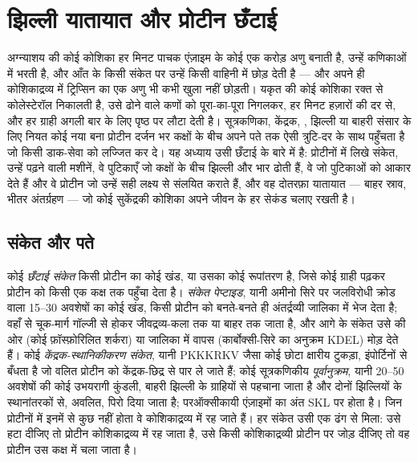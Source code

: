 \chapter{झिल्ली यातायात और प्रोटीन छँटाई}\label{ch:b3:membrane-traffic}

अग्न्याशय की कोई कोशिका हर मिनट पाचक एंज़ाइम के कोई एक करोड़ अणु बनाती
है, उन्हें कणिकाओं में भरती है, और आँत के किसी संकेत पर उन्हें किसी
वाहिनी में छोड़ देती है --- और अपने ही कोशिकाद्रव्य में ट्रिप्सिन का एक
अणु भी कभी खुला नहीं छोड़ती। यकृत की कोई कोशिका रक्त से कोलेस्टेरॉल
निकालती है, उसे ढोने वाले कणों को पूरा-का-पूरा निगलकर, हर मिनट हज़ारों
की दर से, और हर ग्राही अगली बार के लिए पृष्ठ पर लौटा देती है।
सूत्रकणिका, केंद्रक, , झिल्ली या बाहरी संसार के लिए नियत कोई
नया बना प्रोटीन दर्जन भर कक्षों के बीच अपने पते तक ऐसी त्रुटि-दर के साथ
पहुँचता है जो किसी डाक-सेवा को लज्जित कर दे। यह अध्याय उसी छँटाई के
बारे में है: प्रोटीनों में लिखे संकेत, उन्हें पढ़ने वाली मशीनें, वे
पुटिकाएँ जो कक्षों के बीच झिल्ली और भार ढोती हैं, वे  जो पुटिकाओं
को आकार देते हैं और वे प्रोटीन जो उन्हें सही लक्ष्य से संलयित कराते
हैं, और वह दोतरफ़ा यातायात --- बाहर स्राव, भीतर अंतर्ग्रहण --- जो कोई
सुकेंद्रकी कोशिका अपने जीवन के हर सेकंड चलाए रखती है।

\section{संकेत और पते}

\begin{definition}[छँटाई संकेत]\label{def:b3:membrane-traffic:signals}
कोई \emph{छँटाई संकेत} किसी प्रोटीन का कोई खंड, या उसका कोई रूपांतरण
है, जिसे कोई ग्राही पढ़कर प्रोटीन को किसी एक कक्ष तक पहुँचा देता है।
\emph{संकेत पेप्टाइड}, यानी अमीनो सिरे पर जलविरोधी क्रोड वाला
\numrange{15}{30} अवशेषों का कोई खंड, किसी प्रोटीन को बनते-बनते ही
अंतर्द्रव्यी जालिका में भेज देता है; वहाँ से चूक-मार्ग गॉल्जी से होकर
जीवद्रव्य-कला तक या बाहर तक जाता है, और आगे के संकेत उसे  की ओर
(कोई फ़ॉस्फ़ोरिलित शर्करा) या जालिका में वापस (कार्बोक्सी-सिरे का
अनुक्रम KDEL) मोड़ देते हैं। कोई
\emph{केंद्रक-स्थानिकीकरण संकेत}, यानी PKKKRKV जैसा कोई छोटा क्षारीय
टुकड़ा, इंपोर्टिनों से बँधता है जो वलित प्रोटीन को केंद्रक-छिद्र से पार
ले जाते हैं; कोई सूत्रकणिकीय \emph{पूर्वानुक्रम}, यानी
\numrange{20}{50} अवशेषों की कोई उभयरागी कुंडली, बाहरी झिल्ली के
ग्राहियों से पहचाना जाता है और दोनों झिल्लियों के स्थानांतरकों से,
अवलित, पिरो दिया जाता है; परऑक्सीकायी एंज़ाइमों का अंत SKL पर होता है।
जिन प्रोटीनों में इनमें से कुछ नहीं होता वे कोशिकाद्रव्य में रह जाते
हैं। हर संकेत उसी एक ढंग से मिला: उसे हटा दीजिए तो प्रोटीन
कोशिकाद्रव्य में रह जाता है, उसे किसी कोशिकाद्रव्यी प्रोटीन पर जोड़
दीजिए तो वह प्रोटीन उस कक्ष में चला जाता है।
\end{definition}

